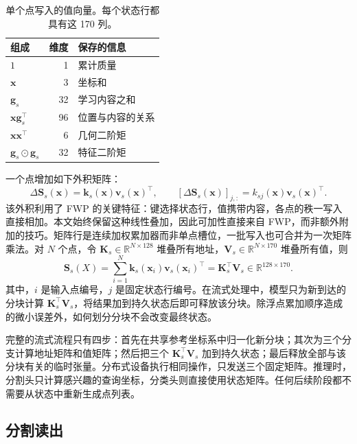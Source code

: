 \documentclass[UTF8,a4paper,11pt,fontset=windows]{ctexart}
\newcommand{\R}{\mathbb{R}}
\newcommand{\Sstate}{\mathbf{S}}
\begin{document}
\begin{table}[htbp]
\centering
\caption{单个点写入的值向量。每个状态行都具有这 170 列。}
\begin{tabular}{lrl}
\toprule
组成 & 维度 & 保存的信息\\
\midrule
$1$ & 1 & 累计质量\\
$\bm x$ & 3 & 坐标和\\
$\bm g_s$ & 32 & 学习内容之和\\
$\bm x\bm g_s^\top$ & 96 & 位置与内容的关系\\
$\bm x\bm x^\top$ & 6 & 几何二阶矩\\
$\bm g_s\odot\bm g_s$ & 32 & 特征二阶矩\\
\bottomrule
\end{tabular}
\end{table}

一个点增加如下外积矩阵：
\begin{equation}
\Delta\Sstate_s(\bm x)=\bm k_s(\bm x)\bm v_s(\bm x)^\top,
\qquad
[\Delta\Sstate_s(\bm x)]_{j,:}=k_{sj}(\bm x)\bm v_s(\bm x)^\top.
\label{eq:single-write}
\end{equation}
该外积利用了 FWP 的关键特征：键选择状态行，值携带内容，各点的秩一写入直接相加。本文始终保留这种线性叠加，因此可加性直接来自 FWP，而非额外附加的技巧。矩阵行是连续加权累加器而非单点槽位，一批写入也可合并为一次矩阵乘法。对 $N$ 个点，令 $\bm K_s\in\R^{N\times128}$ 堆叠所有地址，$\bm V_s\in\R^{N\times170}$ 堆叠所有值，则
\begin{equation}
\Sstate_s(X)=\sum_{i=1}^{N}\bm k_s(\bm x_i)\bm v_s(\bm x_i)^\top
=\bm K_s^\top\bm V_s\in\R^{128\times170}.
\label{eq:state}
\end{equation}
其中，$i$ 是输入点编号，$j$ 是固定状态行编号。在流式处理中，模型只为新到达的分块计算 $\bm K_s^\top\bm V_s$，将结果加到持久状态后即可释放该分块。除浮点累加顺序造成的微小误差外，如何划分分块不会改变最终状态。

完整的流式流程只有四步：首先在共享参考坐标系中归一化新分块；其次为三个分支计算地址矩阵和值矩阵；然后把三个 $\bm K_s^\top\bm V_s$ 加到持久状态；最后释放全部与该分块有关的临时张量。分布式设备执行相同操作，只发送三个固定矩阵。推理时，分割头只计算感兴趣的查询坐标，分类头则直接使用状态矩阵。任何后续阶段都不需要从状态中重新生成点列表。

\subsection{分割读出}
\end{document}
